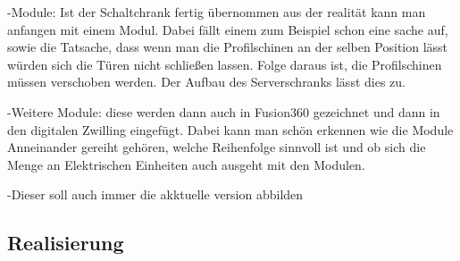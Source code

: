    -Module: Ist der Schaltchrank fertig übernommen aus der realität kann man anfangen mit einem Modul. Dabei fällt einem zum Beispiel schon eine sache auf, sowie die Tatsache, dass wenn man die Profilschinen an der selben Position lässt würden sich die Türen nicht schließen lassen. Folge daraus ist, die Profilschinen müssen verschoben werden. Der Aufbau des Serverschranks lässt dies zu.

    -Weitere Module: diese werden dann auch in Fusion360 gezeichnet und dann in den digitalen Zwilling eingefügt. Dabei kann man schön erkennen wie die Module Anneinander gereiht gehören, welche Reihenfolge sinnvoll ist und ob sich die Menge an Elektrischen Einheiten auch ausgeht mit den Modulen. 

    -Dieser soll auch immer die akktuelle version abbilden


\subsection{Realisierung}
\label{sec:Schaltplan}



